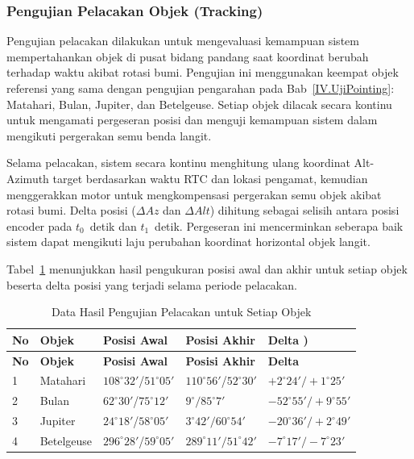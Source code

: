 \subsubsection{Pengujian Pelacakan Objek (Tracking)} \label{IV.UjiTracking}
Pengujian pelacakan dilakukan untuk mengevaluasi kemampuan sistem mempertahankan objek di pusat bidang pandang saat koordinat berubah terhadap waktu akibat rotasi bumi. Pengujian ini menggunakan keempat objek referensi yang sama dengan pengujian pengarahan pada Bab~\ref{IV.UjiPointing}: Matahari, Bulan, Jupiter, dan Betelgeuse. Setiap objek dilacak secara kontinu untuk mengamati pergeseran posisi dan menguji kemampuan sistem dalam mengikuti pergerakan semu benda langit. \par

Selama pelacakan, sistem secara kontinu menghitung ulang koordinat Alt-Azimuth target berdasarkan waktu RTC dan lokasi pengamat, kemudian menggerakkan motor untuk mengkompensasi pergerakan semu objek akibat rotasi bumi. Delta posisi ($\Delta Az$ dan $\Delta Alt$) dihitung sebagai selisih antara posisi encoder pada $t_0$~detik dan $t_1$~detik. Pergeseran ini mencerminkan seberapa baik sistem dapat mengikuti laju perubahan koordinat horizontal objek langit. \par

Tabel~\ref{table:4.tracking_1hour_data} menunjukkan hasil pengukuran posisi awal dan akhir untuk setiap objek beserta delta posisi yang terjadi selama periode pelacakan.
\begin{longtable}{|p{}|p{}|p{}|p{}|p{}|}
    \caption{Data Hasil Pengujian Pelacakan untuk Setiap Objek}
    \label{table:4.tracking_1hour_data} \\
    \hline
    \textbf{No} & \textbf{Objek} & \textbf{Posisi Awal} & \textbf{Posisi Akhir} & \textbf{Delta )} \\
    \hline
    \endfirsthead
    \hline
    \textbf{No} & \textbf{Objek} & \textbf{Posisi Awal} & \textbf{Posisi Akhir} & \textbf{Delta} \\
    \hline
    \endhead
    \hline
    \endfoot
    \hline
    \endlastfoot

    1 & Matahari & $108^\circ32'$/$51^\circ05'$ & $110^\circ56'$/$52^\circ30'$ & $+2^\circ24' / +1^\circ25'$ \\ \hline
    2 & Bulan & $62^\circ30'$/$75^\circ12'$ & $9^\circ/85^\circ7'$ & $-52^\circ55' / +9^\circ55'$ \\ \hline
    3 & Jupiter & $24^\circ18'$/$58^\circ05'$ & $3^\circ42' / 60^\circ54'$ & $-20^\circ36' / +2^\circ49'$ \\ \hline
    4 & Betelgeuse & $296^\circ28'$/$59^\circ05'$ & $289^\circ11' / 51^\circ42'$ & $-7^\circ17' / -7^\circ23'$ \\ \hline
\end{longtable}

